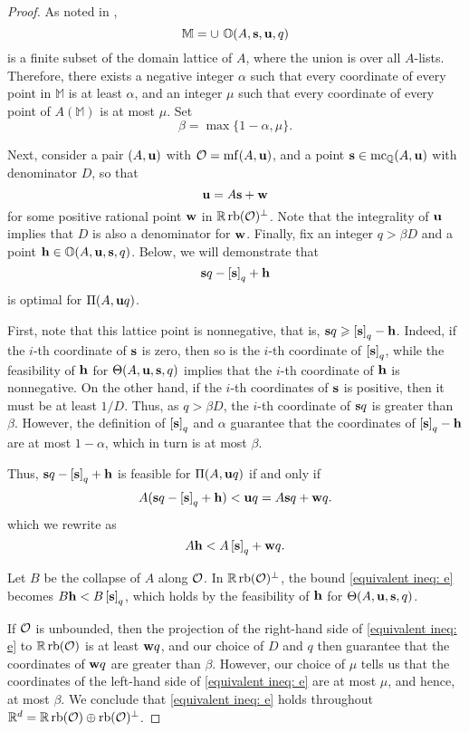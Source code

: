 \documentclass[11pt]{amsart}
\begin{document}
\begin{proof} As noted in , 
%
\[ \mathbb{M} = \cup  \ \mathbb{O}( A, \mathbf{s}, \mathbf{u}, q )\]
%
is a finite subset of the domain lattice of $A$, where the union is over all $A$-lists.  Therefore, there exists a negative integer $\alpha$ such that every coordinate of every point in $\mathbb{M}$ is at least $\alpha$, and an integer $\mu$ such that every coordinate of every point of $A (\mathbb{M})$ is at most $\mu$.  Set \[ \beta =  \max \{ 1-\alpha, \mu \}.\]

Next, consider a pair $(A, \mathbf{u})$ with $\mathcal{O} = \operatorname{mf}(A, \mathbf{u})$, and a point $\mathbf{s} \in \operatorname{mc}_{\mathbb{Q}}(A, \mathbf{u})$ with denominator $D$, so that  \[ \mathbf{u} = A \mathbf{s} + \mathbf{w} \] for some positive rational point $\mathbf{w}$ in $\mathbb{R} \operatorname{rb}(\mathcal{O})^{\perp}$.  Note that the integrality of $\mathbf{u}$ implies that $D$ is also a denominator for $\mathbf{w}$.  Finally, fix an integer $q > \beta D$ and a point $\mathbf{h} \in \mathbb{O}(A, \mathbf{u}, \mathbf{s}, q)$.  Below, we will demonstrate that \[ \mathbf{s}q - \left[ \mathbf{s} \right]_q + \mathbf{h}\] is optimal for $\Pi(A, \mathbf{u}q)$.  

First, note that this lattice point is nonnegative, that is,   $\mathbf{s}q \geqslant \left[ \mathbf{s} \right]_q - \mathbf{h}$.  Indeed, if the $i$-th coordinate of $\mathbf{s}$ is zero, then so is the $i$-th coordinate of $\left[ \mathbf{s} \right]_q$, while the feasibility of  $\mathbf{h}$ for $\Theta(A, \mathbf{u}, \mathbf{s}, q)$ implies that the $i$-th coordinate of $\mathbf{h}$ is nonnegative.  On the other hand, if the $i$-th coordinates of $\mathbf{s}$ is positive, then it must be at least $1/D$.  Thus, as $q > \beta D$, the $i$-th coordinate of $\mathbf{s}q$ is greater than $\beta$.  However, the definition of $\left[ \mathbf{s} \right]_q$ and $\alpha$ guarantee that the coordinates of $\left[ \mathbf{s} \right]_q - \mathbf{h}$ are at most $1-\alpha$, which in turn is at most $\beta$.

Thus, $\mathbf{s}q - \left[ \mathbf{s} \right]_q + \mathbf{h}$ is feasible for $\Pi(A, \mathbf{u}q)$ if and only if
\[ A (\mathbf{s}q - \left[ \mathbf{s} \right]_q + \mathbf{h})  < \mathbf{u}q = A {\mathbf{s}}q + \mathbf{w}q.\] 
which we rewrite as 
\begin{equation} 
\label{equivalent ineq: e}
A \mathbf{h} < A \left[ \mathbf{s} \right]_q + \mathbf{w}q.
\end{equation}

Let $B$ be the collapse of $A$ along $\mathcal{O}$.  In $\mathbb{R} \operatorname{rb}(\mathcal{O})^{\perp}$, the bound \eqref{equivalent ineq: e} becomes $B \mathbf{h} < B \left[ \mathbf{s} \right]_q$, which holds by the feasibility of $\mathbf{h}$ for $\Theta(A, \mathbf{u}, \mathbf{s}, q)$.  

If $\mathcal{O}$ is unbounded, then the projection of the right-hand side of \eqref{equivalent ineq: e} to $\mathbb{R} \operatorname{rb}(\mathcal{O})$ is at least $\mathbf{w}q$, and our choice of $D$ and $q$ then guarantee that the coordinates of $\mathbf{w}q$ are greater than $\beta$.  However,  our choice of $\mu$ tells us that the coordinates of the left-hand side of \eqref{equivalent ineq: e} are at most $\mu$, and hence, at most $\beta$.  We conclude that \eqref{equivalent ineq: e} holds throughout $\mathbb{R}^d = \mathbb{R} \operatorname{rb}(\mathcal{O}) \oplus \operatorname{rb}(\mathcal{O})^{\perp}$.


\end{proof}
\end{document}
